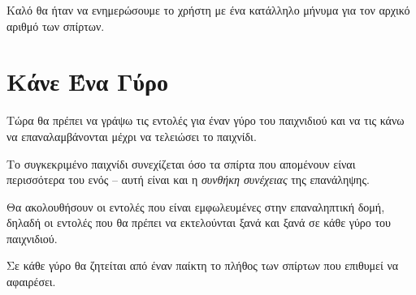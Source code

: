 \documentclass[a4paper,11pt,oneside]{book}
\begin{document}


Καλό θα ήταν να ενημερώσουμε το χρήστη με ένα κατάλληλο μήνυμα για τον αρχικό αριθμό των σπίρτων.



\section{Κάνε Ένα Γύρο}

\begin{question}
Τώρα θα πρέπει να γράψω τις εντολές για έναν γύρο του παιχνιδιού και να τις κάνω να επαναλαμβάνονται μέχρι να τελειώσει το παιχνίδι.
\end{question}

Το συγκεκριμένο παιχνίδι συνεχίζεται όσο τα σπίρτα που απομένουν είναι περισσότερα του ενός -- αυτή είναι και η \emph{συνθήκη συνέχειας} της επανάληψης.


Θα ακολουθήσουν οι εντολές που είναι εμφωλευμένες στην επαναληπτική δομή, δηλαδή οι εντολές που θα πρέπει να εκτελούνται ξανά και ξανά σε κάθε γύρο του παιχνιδιού.


Σε κάθε γύρο θα ζητείται από έναν παίκτη το πλήθος των σπίρτων που επιθυμεί να αφαιρέσει. 
\end{document}
